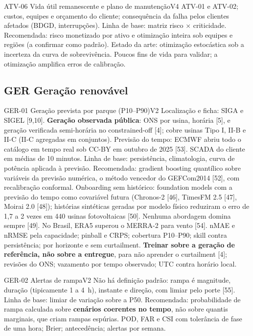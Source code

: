 \begin{ficha}{ATV-06 \textperiodcentered{} Vida útil remanescente e plano de manutenção}{V4}
 ATV-01 e ATV-02; custos, equipes e orçamento do cliente;
consequência da falha pelos clientes afetados (BDGD, interrupções).
 Linha de base: matriz risco × criticidade. Recomendada:
risco monetizado por ativo e otimização inteira sob equipes e regiões (a
confirmar como padrão). Estado da arte: otimização estocástica sob a
incerteza da curva de sobrevivência.
 Poucos fins de vida para validar; a otimização amplifica
erros de calibração.
\end{ficha}

\subsection{GER \textperiodcentered{} Geração renovável}

\begin{ficha}{GER-01 \textperiodcentered{} Geração prevista por parque (P10--P90)}{V2}
 Localização e ficha: SIGA e SIGEL [9,10]. \textbf{Geração
observada pública}: ONS por usina, horária [5], e geração verificada
semi-horária no constrained-off [4]; cobre usinas Tipo I, II-B e II-C (II-C
agregadas em conjuntos). Previsão do tempo: ECMWF abriu todo o catálogo em
tempo real sob CC-BY em outubro de 2025 [53]. SCADA do cliente em médias de
10 minutos.
 Linha de base: persistência, climatologia, curva de
potência aplicada à previsão. Recomendada: gradient boosting quantílico sobre
variáveis da previsão numérica, o método vencedor do GEFCom2014 [52], com
recalibração conformal. Onboarding sem histórico: foundation models com a
previsão do tempo como covariável futura (Chronos-2 [46], TimesFM 2.5 [47],
Moirai 2.0 [48]); histórias sintéticas geradas por modelo físico reduziram o
erro de 1,7 a 2 vezes em 440 usinas fotovoltaicas [50]. Nenhuma abordagem
domina sempre [49]. No Brasil, ERA5 superou o MERRA-2 para vento [54].
 nMAE e nRMSE pela capacidade; pinball e CRPS; cobertura
P10--P90; skill contra persistência; por horizonte e sem curtailment.
 \textbf{Treinar sobre a geração de referência, não sobre a
entregue}, para não aprender o curtailment [4]; revisões do ONS; vazamento
por tempo observado; UTC contra horário local.
\end{ficha}

\begin{ficha}{GER-02 \textperiodcentered{} Alertas de rampa}{V2}
 Não há definição padrão: rampa é magnitude, duração
(tipicamente 1 a 4~h), instante e direção, com limiar pelo porte [55].
Linha de base: limiar de variação sobre a P50. Recomendada: probabilidade de
rampa calculada sobre \textbf{cenários coerentes no tempo}, não sobre quantis
marginais, que criam rampas espúrias.
 POD, FAR e CSI com tolerância de fase de uma hora; Brier;
antecedência; alertas por semana.
\end{ficha}

